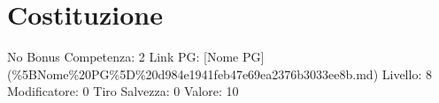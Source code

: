 \section{Costituzione}\label{costituzione}

\begin{description}
\tightlist
\item[Tags: STAT]
No Bonus Competenza: 2 Link PG: {[}Nome PG{]}
(\%5BNome\%20PG\%5D\%20d984e1941feb47e69ea2376b3033ee8b.md) Livello: 8
Modificatore: 0 Tiro Salvezza: 0 Valore: 10
\end{description}
